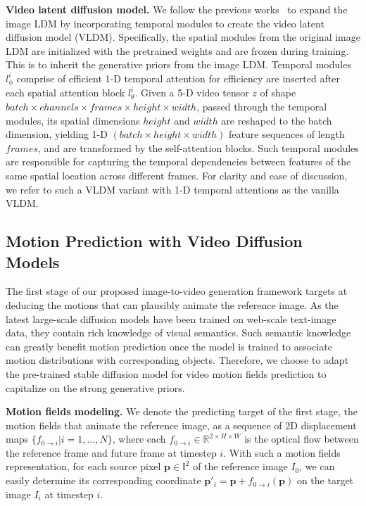 \documentclass[10pt,twocolumn,letterpaper]{article}
\begin{document}
\noindent \textbf{Video latent diffusion model.}
\label{vldm}
We follow the previous works~\cite{guo2023animatediff,blattmann2023align,xing2023dynamicrafter} to expand the image LDM by incorporating temporal modules to create the video latent diffusion model (VLDM). Specifically, the spatial modules from the original image LDM are initialized with the pretrained weights and are frozen during training. This is to inherit the generative priors from the image LDM. Temporal modules $l^i_\phi$ comprise of efficient 1-D temporal attention for efficiency are inserted after each spatial attention block $l^i_\theta$. Given a 5-D video tensor $z$ of shape $batch \times channels \times frames \times height \times width$, passed through the temporal modules, its spatial dimensions $height$ and $width$ are reshaped to the batch dimension, yielding 1-D $(batch \times height \times width)$ feature sequences of length $frames$, and are transformed by the self-attention blocks. Such temporal modules are responsible for capturing the temporal dependencies between features of the same spatial location across different frames. For clarity and ease of discussion, we refer to such a VLDM variant with 1-D temporal attentions as the vanilla VLDM.

\subsection{Motion Prediction with Video Diffusion Models} \label{stage1}

The first stage of our proposed image-to-video generation framework targets at deducing the motions that can plausibly animate the reference image. As the latest large-scale diffusion models have been trained on web-scale text-image data, they contain rich knowledge of visual semantics. Such semantic knowledge can greatly benefit motion prediction once the model is trained to associate motion distributions with corresponding objects. Therefore, we choose to adapt the pre-trained stable diffusion model for video motion fields prediction to capitalize on the strong generative priors.

\noindent \textbf{Motion fields modeling.}
We denote the predicting target of the first stage, the motion fields that animate the reference image, as a sequence of 2D displacement maps $\{f_{0 \rightarrow i} | i=1,\dots,N\}$, where each $f_{0 \rightarrow i} \in \mathbb{R}^{2 \times H\times W}$ is the optical flow between the reference frame and future frame at timestep $i$. With such a motion fields representation, for each source pixel $\mathbf{p} \in \mathbb{I}^{2}$ of the reference image $I_0$, we can easily determine its corresponding coordinate $\mathbf{p}'_{i} = \mathbf{p} + f_{0 \rightarrow i}(\mathbf{p})$ on the target image $I_{i}$ at timestep $i$.
\end{document}
